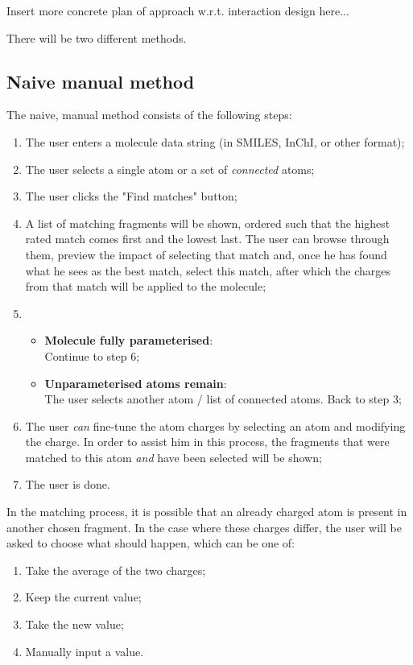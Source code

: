 Insert more concrete plan of approach w.r.t. interaction design here...

There will be two different methods. 

\subsection{Naive manual method}
The naive, manual method consists of the following steps:
\begin{enumerate}[itemsep=.1em, parsep=.2em, topsep=0em]
\item The user enters a molecule data string (in SMILES, InChI, or other format);
\item The user selects a single atom or a set of \emph{connected} atoms;
\item The user clicks the "Find matches" button;
\item A list of matching fragments will be shown, ordered such that the highest rated match comes first and the lowest last. The user can browse through them, preview the impact of selecting that match and, once he has found what he sees as the best match, select this match, after which the charges from that match will be applied to the molecule;
\item
\begin{itemize}[leftmargin=0cm, itemsep=.1em, parsep=.1em]
\item[] {\bf Molecule fully parameterised}:\\Continue to step 6;
\item[]{\bf Unparameterised atoms remain}:\\The user selects another atom / list of connected atoms. Back to step 3;
\end{itemize}
\item The user \emph{can} fine-tune the atom charges by selecting an atom and modifying the charge. In order to assist him in this process, the fragments that were matched to this atom \emph{and} have been selected will be shown;
\item The user is done.
\end{enumerate}

\noindent
In the matching process, it is possible that an already charged atom is present in another chosen fragment. In the case where these charges differ, the user will be asked to choose what should happen, which can be one of:
\begin{enumerate}[itemsep=.1em, parsep=.2em, topsep=0em]
\item Take the average of the two charges;
\item Keep the current value;
\item Take the new value;
\item Manually input a value.
\end{enumerate}

